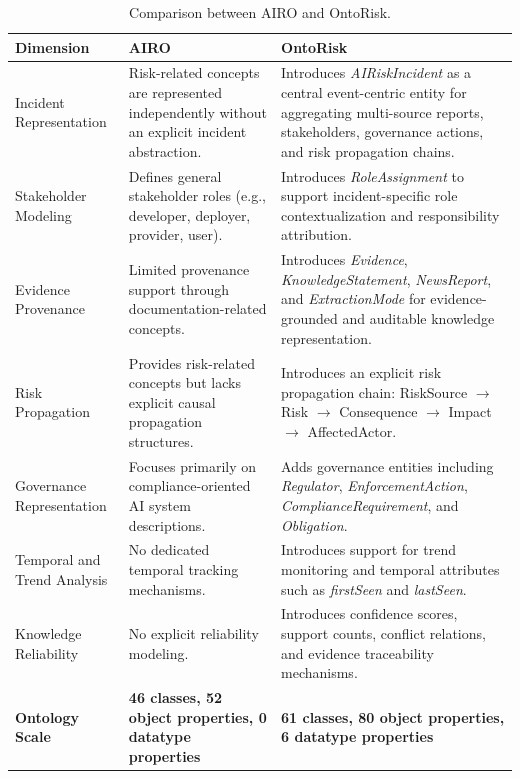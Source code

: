 \documentclass[a4paper,fleqn]{cas-dc}
\begin{document}
\begin{table}[t]
\centering
\caption{Comparison between AIRO and OntoRisk.}
\label{tab:ontology-comparison}
\footnotesize
\begin{tabular}{p{3cm}p{5.2cm}p{6.2cm}}
\toprule
Dimension & AIRO & OntoRisk \\
\midrule

Incident Representation
&
Risk-related concepts are represented independently without an explicit incident abstraction.
&
Introduces \textit{AIRiskIncident} as a central event-centric entity for
aggregating multi-source reports, stakeholders, governance actions, and risk
propagation chains.
\\

Stakeholder Modeling
&
Defines general stakeholder roles (e.g., developer, deployer, provider, user).
&
Introduces \textit{RoleAssignment} to support incident-specific role
contextualization and responsibility attribution.
\\

Evidence Provenance
&
Limited provenance support through documentation-related concepts.
&
Introduces \textit{Evidence}, \textit{KnowledgeStatement}, \textit{NewsReport},
and \textit{ExtractionMode} for evidence-grounded and auditable knowledge
representation.
\\

Risk Propagation
&
Provides risk-related concepts but lacks explicit causal propagation structures.
&
Introduces an explicit risk propagation chain:
RiskSource $\rightarrow$ Risk $\rightarrow$ Consequence $\rightarrow$ Impact
$\rightarrow$ AffectedActor.
\\

Governance Representation
&
Focuses primarily on compliance-oriented AI system descriptions.
&
Adds governance entities including \textit{Regulator},
\textit{EnforcementAction}, \textit{ComplianceRequirement}, and
\textit{Obligation}.
\\

Temporal and Trend Analysis
&
No dedicated temporal tracking mechanisms.
&
Introduces support for trend monitoring and temporal attributes such as
\textit{firstSeen} and \textit{lastSeen}.
\\

Knowledge Reliability
&
No explicit reliability modeling.
&
Introduces confidence scores, support counts, conflict relations, and evidence
traceability mechanisms.
\\

\textbf{Ontology Scale}
&
\textbf{46 classes, 52 object properties, 0 datatype properties}
&
\textbf{61 classes, 80 object properties, 6 datatype properties}
\\
\bottomrule
\end{tabular}
\end{table}
\end{document}
